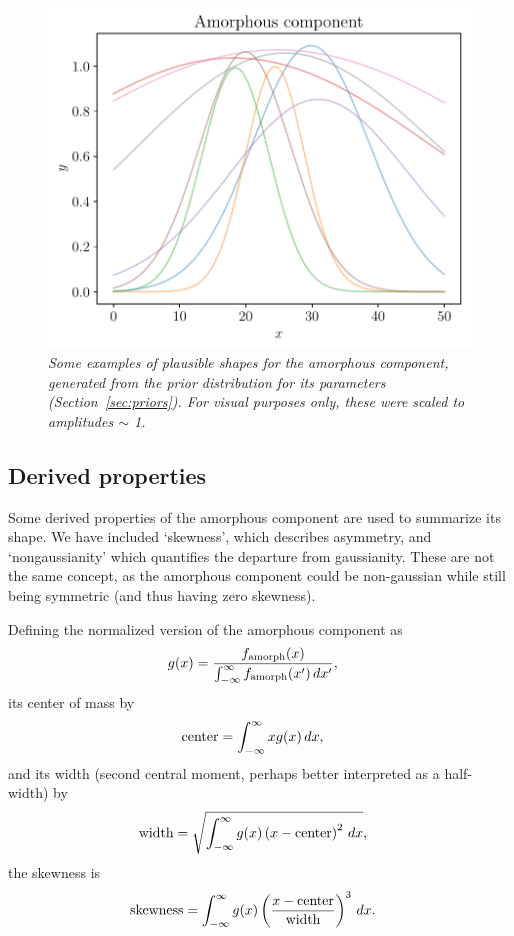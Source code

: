\documentclass[review]{elsarticle}
\newcommand{\x}{x}
\begin{document}
\begin{figure}[!ht]
\centering
\includegraphics[scale=0.7]{figures/wide_component.pdf}
\caption{\it Some examples of plausible shapes for the amorphous component,
generated from the prior distribution for its parameters
(Section~\ref{sec:priors}). For visual purposes only, these
were scaled to amplitudes $\sim$ 1. \label{fig:wide_component}}
\end{figure}

\subsection{Derived properties}
Some derived properties of the amorphous component are used to summarize its shape.
We have included `skewness', which describes asymmetry, and `nongaussianity'
which quantifies the departure from gaussianity. These are not the same
concept, as the amorphous component could be non-gaussian while still being symmetric
(and thus having zero skewness).

Defining the normalized version of the amorphous component as
\begin{align}
g(\x) &= \frac{f_{\rm amorph}(\x)}
             {\int_{-\infty}^\infty f_{\rm amorph}(\x') \, d\x'},
\end{align}
its center of mass by
\begin{align}
\textnormal{center} &= \int_{-\infty}^\infty x g(\x) \, d\x,
\end{align}
and its width (second central moment, perhaps better interpreted
as a half-width) by
\begin{align}
\textnormal{width} &= \sqrt{\int_{-\infty}^\infty
                            g(\x) \left(\x - \textnormal{center}\right)^2
                            \, d\x},
\end{align}
the skewness is
\begin{align}
\textnormal{skewness} &= \int_{-\infty}^\infty
                           g(\x) 
                           \left(
                             \frac{x - \textnormal{center}}{\textnormal{width}}
                           \right)^3
                         \, d\x.
\end{align}
\end{document}
